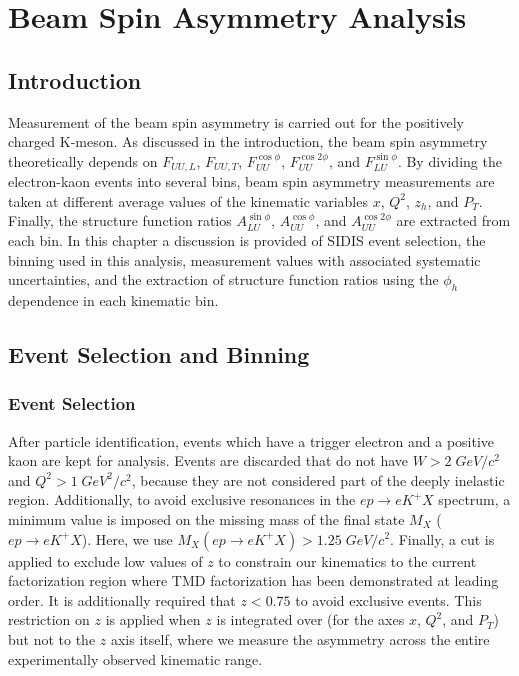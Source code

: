 \chapter{Beam Spin Asymmetry Analysis}

\section{Introduction}
Measurement of the beam spin asymmetry is carried out for the positively charged K-meson.  As discussed in the introduction, the beam spin asymmetry theoretically depends on $F_{UU,L}$, $F_{UU,T}$, $F_{UU}^{\cos\phi}$, $F_{UU}^{\cos 2\phi}$, and $F_{LU}^{\sin\phi}$.  By dividing the electron-kaon events into several bins, beam spin asymmetry measurements are taken at different average values of the kinematic variables $x$, $Q^2$, $z_h$, and $P_T$.  Finally, the structure function ratios $A_{LU}^{\sin\phi}$, $A_{UU}^{\cos\phi}$, and $A_{UU}^{\cos 2\phi}$ are extracted from each bin.  In this chapter a discussion is provided of SIDIS event selection, the binning used in this analysis, measurement values with associated systematic uncertainties, and the extraction of structure function ratios using the $\phi_h$ dependence in each kinematic bin.

\section{Event Selection and Binning}
\subsection{Event Selection}
After particle identification, events which have a trigger electron and a positive kaon are kept for analysis.  Events are discarded that do not have $W > 2 \; GeV/c^2$ and $Q^2 > 1 \; GeV^2/c^2$, because they are not considered part of the deeply inelastic region.  Additionally, to avoid exclusive resonances in the $ep \rightarrow eK^+X$ spectrum, a minimum value is imposed on the missing mass of the final state $M_X$ ($ep \rightarrow eK^+X$).  Here, we use $M_{X} (ep \rightarrow eK^+X) > 1.25 \; GeV/c^2$.  Finally, a cut is applied to exclude low values of $z$ to constrain our kinematics to the current factorization region where TMD factorization has been demonstrated at leading order.  It is additionally required that $z < 0.75$ to avoid exclusive events.  This restriction on $z$ is applied when $z$ is integrated over (for the axes $x$, $Q^2$, and $P_T$) but not to the $z$ axis itself, where we measure the asymmetry across the entire experimentally observed kinematic range.  

